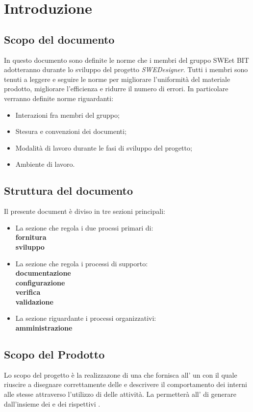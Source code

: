 \section{Introduzione}
  \subsection{Scopo del documento}
          In questo documento sono definite le norme che i membri del gruppo SWEet BIT adotteranno durante lo sviluppo del progetto \emph{SWEDesigner}.
          Tutti i membri sono tenuti a leggere e seguire le norme per migliorare l’uniformità del materiale prodotto, migliorare l’efficienza
          e ridurre il numero di errori.
          In particolare verranno definite norme riguardanti:
            \begin{itemize}
              \item Interazioni fra membri del gruppo;
              \item Stesura e convenzioni dei documenti;
              \item Modalità di lavoro durante le fasi di sviluppo del progetto;
              \item Ambiente di lavoro.
            \end{itemize}
  \subsection{Struttura del documento}
    Il presente document è diviso in tre sezioni principali:
    \begin{itemize}
      \item La sezione che regola i due procssi primari di:\\
      \textbf{fornitura}\\
      \textbf{sviluppo}
      \item La sezione che regola i processi di supporto:\\
      \textbf{documentazione}\\
      \textbf{configurazione}\\
      \textbf{verifica}\\
      \textbf{validazione}
      \item La sezione riguardante i processi organizzativi:\\
      \textbf{amministrazione}
    \end{itemize}
  \subsection{Scopo del Prodotto}
          Lo scopo del progetto è la realizzazone di una  che fornisca all' un   con il quale riuscire a disegnare correttamente  delle 
          e descrivere il comportamento dei  interni alle stesse attraverso l'utilizzo di  delle attività.
          La  permetterà all' di generare   dall'insieme dei  e dei rispettivi .
